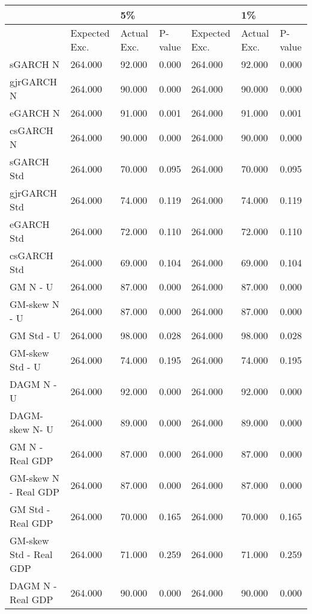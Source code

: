 \documentclass{article}
\begin{document}


\begin{table}[ht] \small
\centering

\begin{tabular}{|l|lll|lll|}

\hline
& & 5\% & & & 1\% & \\
\hline
 & Expected Exc. & Actual Exc. & P-value & Expected Exc. & Actual Exc.  & P-value \\ 
\hline
sGARCH N & 264.000 & 92.000 & 0.000  & 264.000 & 92.000 & 0.000 \\ 
gjrGARCH N & 264.000 & 90.000 & 0.000  & 264.000 & 90.000 & 0.000 \\
eGARCH N & 264.000 & 91.000 & 0.001 & 264.000 & 91.000 & 0.001 \\ 
csGARCH N & 264.000 & 90.000 & 0.000  & 264.000 & 90.000 & 0.000 \\ 
sGARCH Std & 264.000 & 70.000 & 0.095  & 264.000 & 70.000 & 0.095 \\ 
gjrGARCH Std & 264.000 & 74.000 & 0.119  & 264.000 & 74.000 & 0.119 \\ 
eGARCH Std & 264.000 & 72.000 & 0.110 & 264.000 & 72.000 & 0.110 \\
csGARCH Std & 264.000 & 69.000 & 0.104  & 264.000 & 69.000 & 0.104 \\ 
GM N - U & 264.000 & 87.000 & 0.000  & 264.000 & 87.000 & 0.000 \\
GM-skew N - U & 264.000 & 87.000 & 0.000  & 264.000 & 87.000 & 0.000 \\ 
GM Std - U & 264.000 & 98.000 & 0.028  & 264.000 & 98.000 & 0.028 \\ 
GM-skew Std - U & 264.000 & 74.000 & 0.195  & 264.000 & 74.000 & 0.195 \\ 
DAGM N - U & 264.000 & 92.000 & 0.000 & 264.000 & 92.000 & 0.000 \\ 
DAGM-skew  N- U & 264.000 & 89.000 & 0.000 & 264.000 & 89.000 & 0.000 \\ 
GM N - Real GDP & 264.000 & 87.000 & 0.000  & 264.000 & 87.000 & 0.000 \\ 
GM-skew N - Real GDP & 264.000 & 87.000 & 0.000  & 264.000 & 87.000 & 0.000 \\ 
GM Std - Real GDP & 264.000 & 70.000 & 0.165  & 264.000 & 70.000 & 0.165 \\
GM-skew Std - Real GDP & 264.000 & 71.000 & 0.259 & 264.000 & 71.000 & 0.259 \\
DAGM N - Real GDP & 264.000 & 90.000 & 0.000  & 264.000 & 90.000 & 0.000 \\ 

\end{tabular}
\end{table}
\end{document}
